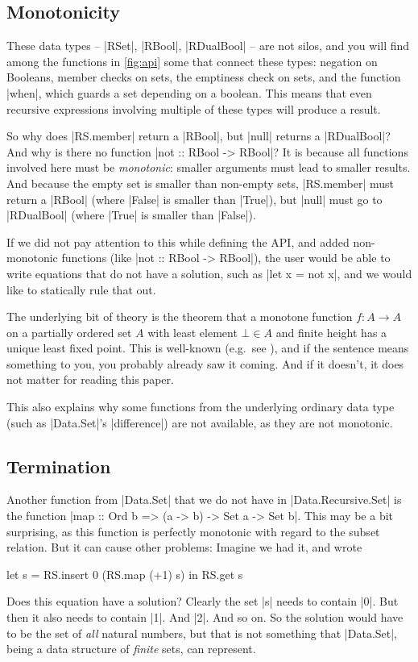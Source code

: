 \documentclass[manuscript,review,screen,acmsmall]{acmart}
\begin{document}
\subsection{Monotonicity}\label{sec:monotonicity}

These data types -- |RSet|, |RBool|, |RDualBool| -- are not silos, and you will find among the functions in \cref{fig:api} some that connect these types: negation on Booleans, member checks on sets, the emptiness check on sets, and the function |when|, which guards a set depending on a boolean.
This means that even recursive expressions involving multiple of these types will produce a result.

So why does |RS.member| return a |RBool|, but |null| returns a |RDualBool|? And why is there no function |not :: RBool -> RBool|? It is because all functions involved here must be \emph{monotonic}: smaller arguments must lead to smaller results. And because the empty set is smaller than non-empty sets, |RS.member| must return a |RBool| (where |False| is smaller than |True|), but |null| must go to |RDualBool| (where |True| is smaller than |False|).

If we did not pay attention to this while defining the API, and added non-monotonic functions (like |not :: RBool -> RBool|), the user would be  able to write equations that do not have a solution, such as
|let x = not x|,
and we would like to statically rule that out.

The underlying bit of theory is the theorem that a monotone function $f : A \to A$ on a partially ordered set $A$ with least element $\bot \in A$ and finite height has a unique least fixed point. This is well-known (e.g.\ see \citep{lazyleast}), and if the sentence means something to you, you probably already saw it coming. And if it doesn't, it does not matter for reading this paper.

This also explains why some functions from the underlying ordinary data type (such as |Data.Set|'s |difference|) are not available, as they are not monotonic.

\subsection{Termination}

Another function from |Data.Set| that we do not have in |Data.Recursive.Set| is the function |map :: Ord b => (a -> b) -> Set a -> Set b|. This may be a bit surprising, as this function is perfectly monotonic with regard to the subset relation. But it can cause other problems: Imagine we had it, and wrote
\begin{code}
let s = RS.insert 0 (RS.map (+1) s) in RS.get s
\end{code}
Does this equation have a solution? Clearly the set |s| needs to contain |0|. But then it also needs to contain |1|. And |2|. And so on. So the solution would have to be the set of \emph{all} natural numbers, but that is not something that |Data.Set|, being a data structure of \emph{finite} sets, can represent.
\end{document}
